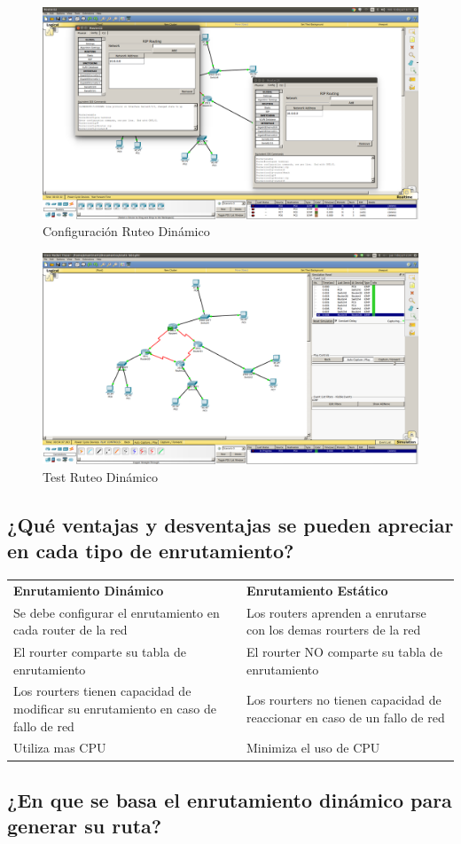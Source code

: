\documentclass[spanish]{udpreport}
\begin{document}
\begin{figure}[H]
	\centering
	\includegraphics[scale=.25]{imagenes/ruteo_dinamic.png}
	\caption{Configuración Ruteo Dinámico}
	\label{fig:Figura 4.1}
\end{figure}

\begin{figure}[H]
	\centering
	\includegraphics[scale=.25]{imagenes/test_rdinamic.png}
	\caption{Test Ruteo Dinámico}
	\label{fig:Figura 4.2}
\end{figure}

\subsection{¿Qué ventajas y desventajas se pueden apreciar en cada tipo de enrutamiento?}
\begin{table}[H]
\centering
\begin{tabular}{p{8cm}|p{8cm}}
\textbf{Enrutamiento Dinámico} & \textbf{Enrutamiento Estático} \\
     Se debe configurar el enrutamiento en cada router de la red &
     Los routers aprenden a enrutarse con los demas rourters de la red \\
     El rourter comparte su tabla de enrutamiento  & 
     El rourter NO comparte su tabla de enrutamiento  \\
     Los rourters tienen capacidad de modificar su enrutamiento en caso de fallo de red &
     Los rourters no tienen capacidad de reaccionar en caso de un fallo de red \\
     Utiliza mas CPU & 
     Minimiza el uso de CPU \\    
\end{tabular}
\end{table}

\subsection{¿En que se basa el enrutamiento dinámico para generar su ruta?}




\listoffigures
\end{document}
